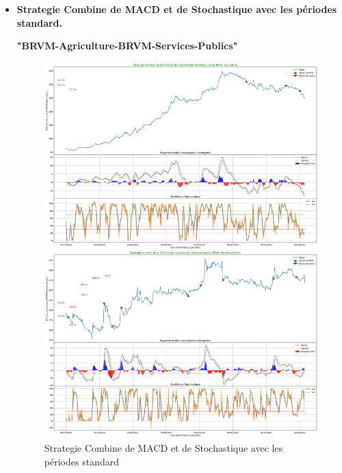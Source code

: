\begin{itemize}
\item[\ding{226}] \textbf{Strategie Combine de MACD et de Stochastique avec les périodes standard.} \\
 \begin{center}     \textbf{"BRVM-Agriculture-BRVM-Services-Publics"}  \end{center}
\begin{samepage}
\begin{figure}[h]
    \centering
    \includegraphics[width=0.8 \textwidth ]{img/MACD-standard.png}
    \caption{Strategie Combine de MACD et de Stochastique avec les périodes standard}
    \label{fig:Strategie Combine de MACD et de Stochastique avec les périodes standard}
\end{figure}
\end{samepage}
\newpage


\end{itemize}
